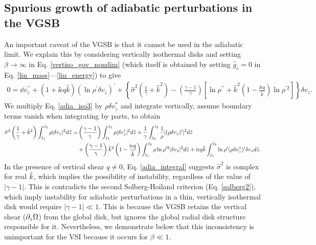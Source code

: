 \subsection{Spurious growth of adiabatic perturbations in the VGSB}\label{analytic_adia} 
An important caveat of the VGSB is that it cannot be used in the
adiabatic limit. We explain this by considering vertically isothermal
disks and setting  $\beta\to\infty$ in 
Eq. \ref{vertiso_gov_nondim} (which itself is obtained by setting
$\hat{g}_c=0$ in Eq. \ref{lin_mass}---\ref{lin_energy}) to give 
\begin{align}
  0 =\dd v_z^{\prime\prime} + \left(1 + \ii \epsilon q
    \hat{k}\right)\left(\ln\rho^{\prime}\delta v_z\right)^\prime
  +\left\{\hat{\sigma}^2\left(\frac{1}{\gamma}+\hat{k}^2\right) 
    -\left(\frac{\gamma-1}{\gamma}\right)\left[\ln\rho^{\prime\prime}+\hat{k}^2\left(1-\frac{\ii\epsilon  
          q}{\hat{k}}\right)\ln\rho^{\prime 2}\right]\right\}\delta v_z.\label{adia_iso3}
\end{align}
We multiply Eq. \ref{adia_iso3} by $\rho\delta v_z^*$ and
integrate vertically, assume boundary terms vanish when integrating by
parts, to obtain
\begin{align}
  \hat{\sigma}^2\left(\frac{1}{\gamma} +
    \hat{k}^2\right)\int_{\hat{z}_1}^{\hat{z}_2}\rho|\delta
  v_z|^2 d\hat{z} 
  =&  \left(\frac{\gamma-1}{\gamma}\right)
  \int_{\hat{z}_1}^{\hat{z}_2}\rho|\delta v_z^\prime|^2 d\hat{z}
  +\frac{1}{\gamma}\int_{\hat{z}_1}^{\hat{z}_2}\frac{1}{\rho}|(\rho\delta
  v_z)^\prime|^2 d\hat{z}\notag\\
&+
  \left(\frac{\gamma-1}{\gamma}\right)\hat{k}^2\left(1-\frac{\mathrm{i}\epsilon
      q}{\hat{k}}\right) \int_{\hat{z}_1}^{\hat{z}_2}\rho\ln\rho^{\prime
    2}|\delta v_z|^2 d\hat{z}
+ \mathrm{i}\epsilon q \hat{k}
  \int_{\hat{z}_1}^{\hat{z}_2}\ln\rho^\prime(\rho\delta v_z^*)^\prime
  \delta v_z d\hat{z}.\label{adia_integral}
\end{align}
In the presence of vertical shear $q\neq0$, Eq. \ref{adia_integral}
suggests $\hat{\sigma}^2$ is complex for real $\hat{k}$, which implies the
possibility of instability, regardless of the value of
$|\gamma-1|$. This is contradicts the second Solberg-Hoiland criterion 
(Eq. \ref{solberg2}), which imply instability for adiabatic
perturbations in a thin, vertically isothermal disk would require 
$|\gamma-1|\ll1$. 
This is because the VGSB retains the vertical shear
($\partial_z\Omega$) from the global disk, but ignores the global radial
disk structure responsible for it. Nevertheless, we demonstrate below
that this inconsistency is unimportant for the VSI because it occurs
for $\beta\ll1$.   

